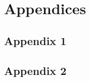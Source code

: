 \appendix
\chapter*{Appendices}
\renewcommand{\thesection}{\Alph{section}}

\section{Appendix 1}
\label{appendix:app_1}

\newpage
\section{Appendix 2}
\label{appendix:app_2}
